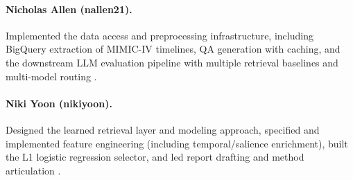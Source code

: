 \paragraph{Nicholas Allen (nallen21).}
Implemented the data access and preprocessing infrastructure, including BigQuery extraction of MIMIC-IV timelines, QA generation with caching, and the downstream LLM evaluation pipeline with multiple retrieval baselines and multi-model routing .

\paragraph{Niki Yoon (nikiyoon).}
Designed the learned retrieval layer and modeling approach, specified and implemented feature engineering (including temporal/salience enrichment), built the L1 logistic regression selector, and led report drafting and method articulation .